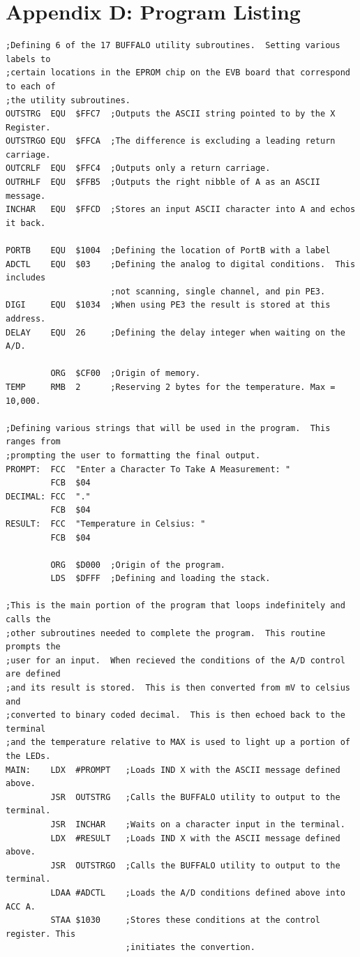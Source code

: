 \documentclass[12pt]{report}
\begin{document}
\section*{Appendix D: Program Listing}
	\begin{Verbatim}[frame=single, fontsize=\small]
;Defining 6 of the 17 BUFFALO utility subroutines.  Setting various labels to
;certain locations in the EPROM chip on the EVB board that correspond to each of
;the utility subroutines.
OUTSTRG  EQU  $FFC7  ;Outputs the ASCII string pointed to by the X Register.
OUTSTRGO EQU  $FFCA  ;The difference is excluding a leading return carriage.
OUTCRLF  EQU  $FFC4  ;Outputs only a return carriage.
OUTRHLF  EQU  $FFB5  ;Outputs the right nibble of A as an ASCII message.
INCHAR   EQU  $FFCD  ;Stores an input ASCII character into A and echos it back.

PORTB    EQU  $1004  ;Defining the location of PortB with a label
ADCTL    EQU  $03    ;Defining the analog to digital conditions.  This includes
                     ;not scanning, single channel, and pin PE3.
DIGI     EQU  $1034  ;When using PE3 the result is stored at this address.
DELAY    EQU  26     ;Defining the delay integer when waiting on the A/D.

         ORG  $CF00  ;Origin of memory.
TEMP     RMB  2      ;Reserving 2 bytes for the temperature. Max = 10,000.

;Defining various strings that will be used in the program.  This ranges from
;prompting the user to formatting the final output.
PROMPT:  FCC  "Enter a Character To Take A Measurement: "
         FCB  $04
DECIMAL: FCC  "."
         FCB  $04
RESULT:  FCC  "Temperature in Celsius: "
         FCB  $04

         ORG  $D000  ;Origin of the program.
         LDS  $DFFF  ;Defining and loading the stack.

;This is the main portion of the program that loops indefinitely and calls the
;other subroutines needed to complete the program.  This routine prompts the
;user for an input.  When recieved the conditions of the A/D control are defined
;and its result is stored.  This is then converted from mV to celsius and
;converted to binary coded decimal.  This is then echoed back to the terminal
;and the temperature relative to MAX is used to light up a portion of the LEDs.
MAIN:    LDX  #PROMPT   ;Loads IND X with the ASCII message defined above.
         JSR  OUTSTRG   ;Calls the BUFFALO utility to output to the terminal.
         JSR  INCHAR    ;Waits on a character input in the terminal.
         LDX  #RESULT   ;Loads IND X with the ASCII message defined above.
         JSR  OUTSTRGO  ;Calls the BUFFALO utility to output to the terminal.
         LDAA #ADCTL    ;Loads the A/D conditions defined above into ACC A.
         STAA $1030     ;Stores these conditions at the control register. This
                        ;initiates the convertion.


\end{Verbatim}
\end{document}
